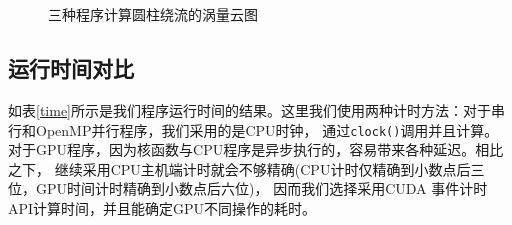 \documentclass[UTF8]{ctexart}
\begin{document}
        \begin{figure}[H]
            \centering
            \\
            \\
            \caption{\textup{\heiti 三种程序计算圆柱绕流的涡量云图} }
            \label{fig:result}
        \end{figure}

        \subsection{运行时间对比}
        如表\ref{time}所示是我们程序运行时间的结果。这里我们使用两种计时方法：对于串行和OpenMP并行程序，我们采用的是CPU时钟，
        通过\texttt{clock()}调用并且计算。对于GPU程序，因为核函数与CPU程序是异步执行的，容易带来各种延迟。相比之下，
        继续采用CPU主机端计时就会不够精确(CPU计时仅精确到小数点后三位，GPU时间计时精确到小数点后六位)，
        因而我们选择采用CUDA 事件计时API计算时间，并且能确定GPU不同操作的耗时。
\end{document}
